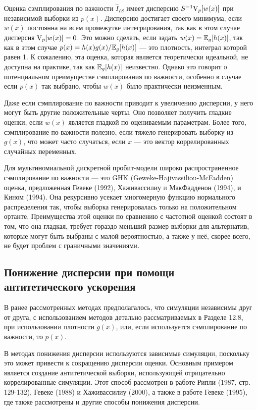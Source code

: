 Оценка сэмплирования по важности $\hat{I}_{IS}$ имеет дисперсию $S^{-1}\mathrm{V}_p[w(x)]$ при независимой выборки из $p(x)$.  Дисперсию достигает своего минимума, если $w(x)$ постоянна на всем промежутке интегрирования, так как в этом случае дисперсия $\mathrm{V}_p[w(x)] = 0$. Это можно сделать, если задать $w(x) = \mathbb{E}_g[h(x)]$,  так как в этом случае $p(x) = h(x)g(x)/\mathbb{E}_g[h(x)]$ --- это плотность, интеграл которой равен 1. К сожалению, эта оценка, которая является теоретически идеальной, не доступна на практике, так как $\mathbb{E}_g[h(x)]$ неизвестно. Однако это говорит о потенциальном преимуществе сэмплирования по важности, особенно в случае если $p(x)$ так выбрано, чтобы $w(x)$ было практически неизменным.

Даже если сэмплирование по важности приводит к увеличению дисперсии, у него могут быть другие положительные черты. Оно позволяет получить гладкие оценки, если $w(x)$ является гладкой по оцениваемым параметрам. Более того, сэмплирование по важности полезно, если тяжело генерировать выборку из $g(x)$, что может часто случаться, если $x$ --- это вектор коррелированных случайных переменных.

Для мультиномиальной дискретной пробит-модели широко распространенное сэмплирование по важности --- это GHK (Geweke-Hajivassiliou-McFadden) оценка, предложенная Гевеке (1992), Хаживассилиу и МакФадденон (1994), и Кином (1994). Она рекурсивно усекает многомерную функцию нормального распределения так, чтобы выборка генерировалась только на положительном ортанте. Преимущества этой оценки по сравнению с частотной оценкой состоят в том, что она гладкая, требует гораздо меньший размер выборки для альтернатив, которые могут быть выбраны с малой вероятностью, а также у неё, скорее всего, не будет проблем с граничными значениями.

\subsection{Понижение дисперсии при помощи антитетического ускорения}

В ранее рассмотренных методах предполагалось, что симуляции независимы друг от друга, с использованием методов детально рассматриваемых в Разделе 12.8, при использовании плотности  $g(x)$, или, если используется сэмплирование по важности, то $p(x)$. 

В методах понижения дисперсии используются зависимые симуляции, поскольку это может привести к сокращению дисперсии оценки. Основным примером является создание антитетической выборки, использующей отрицательно коррелированные симуляции. Этот способ рассмотрен в работе Рипли (1987, стр. 129-132), Гевеке (1988) и Хаживассилиу (2000), а также в работе Гевеке (1995), где также рассмотрены и другие способы понижения дисперсии.

